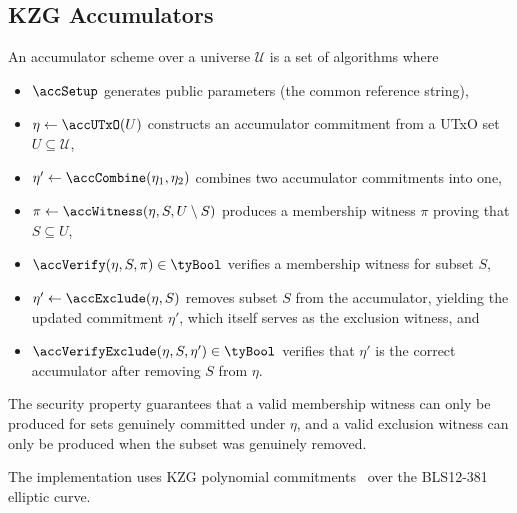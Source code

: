 
\subsection{KZG Accumulators}\label{sec:accumulators}

\noindent An accumulator scheme over a universe $\mathcal{U}$ is a set of algorithms where
\begin{itemize}
  \item $\accSetup$ generates public parameters (the common reference string),
  \item $\eta \gets \accUTxO(U)$ constructs an accumulator commitment from a UTxO set $U \subseteq \mathcal{U}$,
  \item $\eta' \gets \accCombine(\eta_1, \eta_2)$ combines two accumulator commitments into one,
  \item $\pi \gets \accWitness(\eta, S, U \setminus S)$ produces a membership witness $\pi$ proving that $S \subseteq U$,
  \item $\accVerify(\eta, S, \pi) \in \tyBool$ verifies a membership witness for subset $S$,
  \item $\eta' \gets \accExclude(\eta, S)$ removes subset $S$ from the accumulator, yielding the updated commitment $\eta'$, which itself serves as the exclusion witness, and
  \item $\accVerifyExclude(\eta, S, \eta') \in \tyBool$ verifies that $\eta'$ is the correct accumulator after removing $S$ from $\eta$.
\end{itemize}

The security property guarantees that a valid membership witness can only be produced for sets genuinely committed under $\eta$, and a valid exclusion witness can only be produced when the subset was genuinely removed.

The implementation uses KZG polynomial commitments~\cite{KZG10} over the BLS12-381 elliptic curve.

